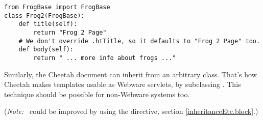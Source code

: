 \begin{verbatim}
from FrogBase import FrogBase
class Frog2(FrogBase):
	def title(self):
		return "Frog 2 Page"
	# We don't override .htTitle, so it defaults to "Frog 2 Page" too.
	def body(self):
		return " ... more info about frogs ..."
\end{verbatim}

Similarly, the Cheetah document can inherit from an arbitrary class. That's
how Cheetah makes templates usable as Webware servlets, by subclassing
.  This technique should be possible for non-Webware systems
too.

({\em Note:}\  could be improved by using the
 directive, section \ref{inheritanceEtc.block}.)


